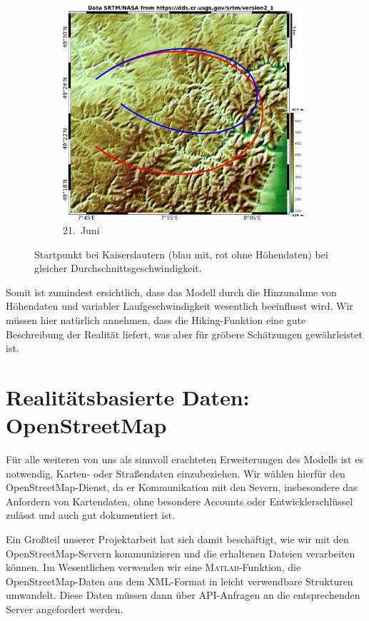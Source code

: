 \documentclass[
    paper=a4,
    DIV14,
    fontsize=12pt,
    pagesize=pdftex,
    toc=bibliographynumbered
]{scrartcl}
\numberwithin{figure}{section}
\numberwithin{equation}{section}
\numberwithin{table}{section}
\begin{document}
\begin{figure}[hbt]
\begin{subfigure}{0.67\textwidth}
        \centering
        \includegraphics[width=0.98\textwidth]{images/elediff/jun21.png}
        \caption{21.\ Juni}
    \end{subfigure}
    \caption{Startpunkt bei Kaiserslautern (blau mit, rot ohne Höhendaten) bei gleicher
    Durchschnittsgeschwindigkeit.}
    \label{fig:elediff1}
\end{figure}

Somit ist zumindest ersichtlich, dass das Modell durch die Hinzunahme von Höhendaten und
variabler Laufgeschwindigkeit wesentlich beeinflusst wird. Wir müssen hier natürlich
annehmen, dass die Hiking-Funktion eine gute Beschreibung der Realität liefert, was aber
für gröbere Schätzungen gewährleistet ist.

\section{Realitätsbasierte Daten: OpenStreetMap}
Für alle weiteren von uns als sinnvoll erachteten Erweiterungen des Modells ist es
notwendig, Karten- oder Straßendaten einzubeziehen. Wir wählen hierfür den
OpenStreetMap-Dienst, da er Kommunikation mit den Severn, insbesondere das Anfordern von
Kartendaten,  ohne besondere Accounts oder Entwicklerschlüssel zulässt und auch gut
dokumentiert ist.

Ein Großteil unserer Projektarbeit hat sich damit beschäftigt, wie wir mit den
OpenStreet\-Map-Servern kommunizieren und die erhaltenen Dateien verarbeiten können. Im
Wesentlichen verwenden wir eine \textsc{Matlab}-Funktion, die OpenStreetMap-Daten aus dem
XML-Format in leicht verwendbare Strukturen umwandelt. Diese Daten müssen dann über
API-Anfragen an die entsprechenden Server angefordert werden.
\end{document}
